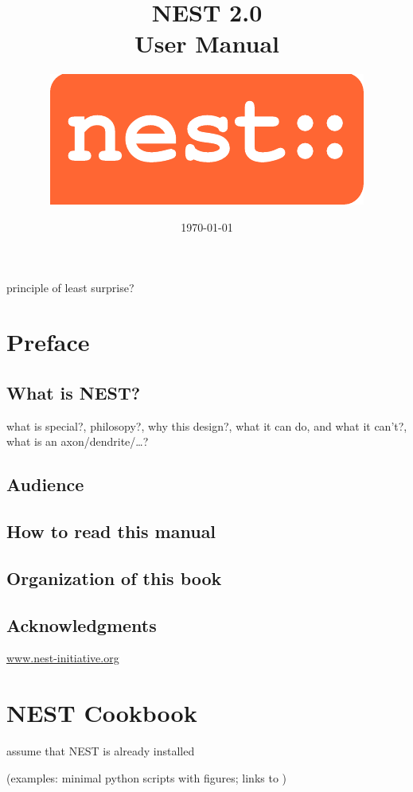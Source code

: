 \documentclass[a4paper,10pt]{report}
\title{\Huge\bf NEST 2.0\\[0.5ex] User Manual}
\author{\includegraphics[width=20ex]{nest-logo}}
\date{\vfill\today}
\begin{document}
\maketitle

\begin{abstract}  
\end{abstract}

\tableofcontents

\clearpage
principle of least surprise?
\chapter{Preface}   
\section{What is NEST?}
what  is special?,
philosopy?,
why this design?,
what it can do, and what it can't?,
what is an axon/dendrite/\ldots?

\section{Audience}
\section{How to read this manual}
\section{Organization of this book}
\section{Acknowledgments}
\href{http://www.nest-initiative.org}{www.nest-initiative.org}

\chapter{NEST Cookbook}
assume that NEST is already installed

(examples: minimal python scripts with figures; links to )
\end{document}
